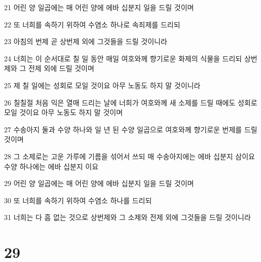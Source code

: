 \par 21 어린 양 일곱에는 매 어린 양에 에바 십분지 일을 드릴 것이며
\par 22 또 너희를 속하기 위하여 수염소 하나로 속죄제를 드리되
\par 23 아침의 번제 곧 상번제 외에 그것들을 드릴 것이니라
\par 24 너희는 이 순서대로 칠 일 동안 매일 여호와께 향기로운 화제의 식물을 드리되 상번제와 그 전제 외에 드릴 것이며
\par 25 제 칠 일에는 성회로 모일 것이요 아무 노동도 하지 말 것이니라
\par 26 칠칠절 처음 익은 열매 드리는 날에 너희가 여호와께 새 소제를 드릴 때에도 성회로 모일 것이요 아무 노동도 하지 말 것이며
\par 27 수송아지 둘과 수양 하나와 일 년 된 수양 일곱으로 여호와께 향기로운 번제를 드릴 것이며
\par 28 그 소제로는 고운 가루에 기름을 섞어서 쓰되 매 수송아지에는 에바 십분지 삼이요 수양 하나에는 에바 십분지 이요
\par 29 어린 양 일곱에는 매 어린 양에 에바 십분지 일을 드릴 것이며
\par 30 또 너희를 속하기 위하여 수염소 하나를 드리되
\par 31 너희는 다 흠 없는 것으로 상번제와 그 소제와 전제 외에 그것들을 드릴 것이니라

\chapter{29}

